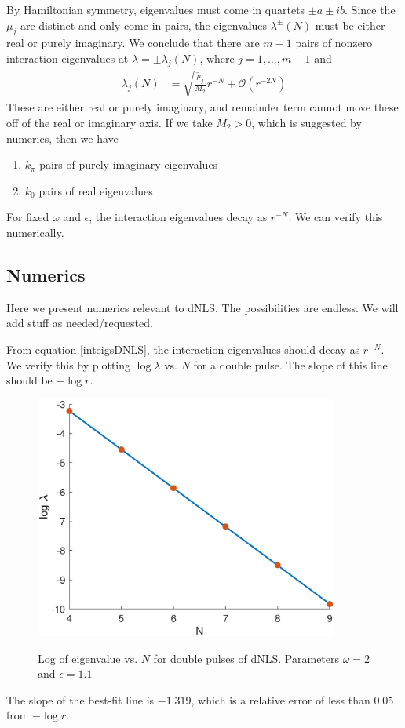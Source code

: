 \documentclass[12pt]{article}
\begin{document}
By Hamiltonian symmetry, eigenvalues must come in quartets $\pm a \pm i b$. Since the $\mu_j$ are distinct and only come in pairs, the eigenvalues $\lambda^\pm(N)$ must be either real or purely imaginary. We conclude that there are $m - 1$ pairs of nonzero interaction eigenvalues at $\lambda = \pm \lambda_j(N)$, where $j = 1, \dots, m-1$ and 
\begin{align}\label{inteigsDNLS}
\lambda_j(N) &= \sqrt{\frac{\tilde{\mu}_j}{M_2}}r^{-N} + \mathcal{O}(r^{-2N}) 
\end{align}
These are either real or purely imaginary, and remainder term cannot move these off of the real or imaginary axis. If we take $M_2 > 0$, which is suggested by numerics, then we have
\begin{enumerate}
	\item $k_\pi$ pairs of purely imaginary eigenvalues
	\item $k_0$ pairs of real eigenvalues
\end{enumerate}

For fixed $\omega$ and $\epsilon$, the interaction eigenvalues decay as $r^{-N}$. We can verify this numerically.

\subsection{Numerics}

Here we present numerics relevant to dNLS. The possibilities are endless. We will add stuff as needed/requested.

From equation \eqref{inteigsDNLS}, the interaction eigenvalues should decay as $r^{-N}$. We verify this by plotting $\log \lambda$ vs. $N$ for a double pulse. The slope of this line should be $-\log r$.
\begin{figure}[H]
\centering
\includegraphics[width=10cm]{eigendecay.eps}
\label{fig:eigendecay}
\caption{Log of eigenvalue vs. $N$ for double pulses of dNLS. Parameters $\omega = 2$ and $\epsilon = 1.1$}
\end{figure}
The slope of the best-fit line is $-1.319$, which is a relative error of less than $0.05$ from $-\log r$.
\end{document}
